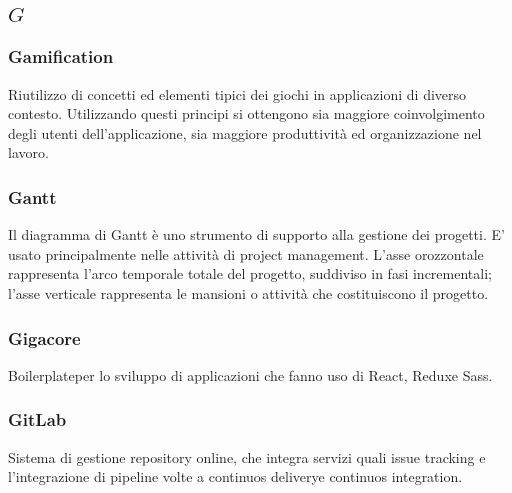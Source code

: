 \subsection*{\quad$G\quad$}
\subsubsection*{Gamification}
Riutilizzo di concetti ed elementi tipici dei giochi in applicazioni di diverso contesto. Utilizzando questi principi si ottengono sia maggiore coinvolgimento degli utenti dell'applicazione, sia maggiore produttività ed organizzazione nel lavoro.

\subsubsection*{Gantt}
Il diagramma di Gantt è uno strumento di supporto alla gestione dei progetti. E' usato principalmente nelle attività di project management. L'asse orozzontale rappresenta l'arco temporale totale del progetto, suddiviso in fasi incrementali; l'asse verticale rappresenta le mansioni o attività che costituiscono il progetto.

\subsubsection*{Gigacore}
Boilerplate\glosp per lo sviluppo di applicazioni che fanno uso di React\glo, Redux\glosp e Sass\glo.

\subsubsection*{GitLab}
Sistema di gestione repository online, che integra servizi quali issue tracking e l'integrazione di pipeline volte a continuos delivery\glosp e continuos integration\glo.

